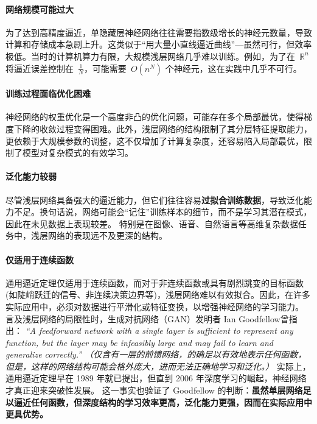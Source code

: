 \paragraph*{ 网络规模可能过大}
为了达到高精度逼近，单隐藏层神经网络往往需要指数级增长的神经元数量，导致计算和存储成本急剧上升。这类似于“用大量小直线逼近曲线”---虽然可行，但效率极低。当时的计算机算力有限，大规模浅层网络几乎难以训练。例如，为了在~$\mathbb{R}^n$ 将逼近误差控制在~$\frac{1}{N}$，可能需要~$ O(n^N)$ 个神经元，这在实践中几乎不可行。
\paragraph*{ 训练过程面临优化困难}
神经网络的权重优化是一个高度非凸的优化问题，可能存在多个局部最优，使得梯度下降的收敛过程变得困难。此外，浅层网络的结构限制了其分层特征提取能力，更依赖于大规模参数的调整，这不仅增加了计算复杂度，还容易陷入局部最优，限制了模型对复杂模式的有效学习。
\paragraph*{泛化能力较弱}
尽管浅层网络具备强大的逼近能力，但它们往往容易{\bf 过拟合训练数据}，导致泛化能力不足。换句话说，网络可能会“记住”训练样本的细节，而不是学习其潜在模式，因此在未见数据上表现较差。 特别是在图像、语音、自然语言等高维复杂数据任务中，浅层网络的表现远不及更深的结构。
\paragraph*{ 仅适用于连续函数}
通用逼近定理仅适用于连续函数，而对于非连续函数或具有剧烈跳变的目标函数(如陡峭跃迁的信号、非连续决策边界等)，浅层网络难以有效拟合。因此，在许多实际应用中，必须对数据进行平滑化或特征变换，以增强神经网络的学习能力。
言及浅层网络的局限性时，生成对抗网络（GAN）发明者 Ian Goodfellow曾指出：
{\em “A feedforward network with a single layer is sufficient to represent any function, but the layer may be infeasibly large and may fail to learn and generalize correctly.”
（仅含有一层的前馈网络，的确足以有效地表示任何函数，但是，这样的网络结构可能会格外庞大，进而无法正确地学习和泛化。）}
实际上，通用逼近定理早在 1989 年就已提出，但直到 2006 年深度学习的崛起，神经网络才真正迎来突破性发展。 这一事实也验证了 Goodfellow 的判断：{\bf 虽然单层网络足以逼近任何函数，但深度结构的学习效率更高，泛化能力更强，因而在实际应用中更具优势。}
